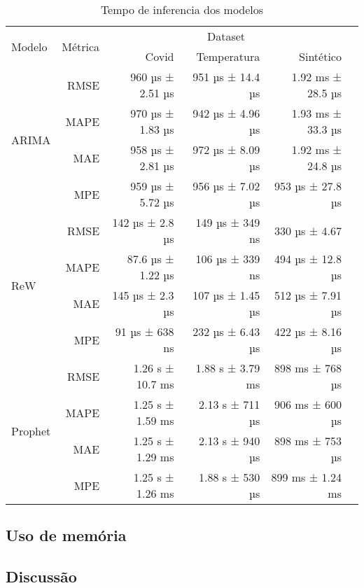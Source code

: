 \begin{table}[!htp]\centering
    \caption{Tempo de inferencia dos modelos}
    \begin{tabular}{lrrrrr}\toprule
    \multirow{2}{*}{Modelo} &\multirow{2}{*}{Métrica} &\multicolumn{3}{c}{Dataset} \\\cmidrule{3-5}
     &  & Covid & Temperatura & Sintético \\ \midrule
    \multirow{4}{*}{ARIMA} & RMSE & 960 µs ± 2.51 µs & 951 µs ± 14.4 µs & 1.92 ms ± 28.5 µs \\
     & MAPE & 970 µs ± 1.83 µs & 942 µs ± 4.96 µs & 1.93 ms ± 33.3 µs \\
     & MAE & 958 µs ± 2.81 µs & 972 µs ± 8.09 µs & 1.92 ms ± 24.8 µs \\
     & MPE & 959 µs ± 5.72 µs & 956 µs ± 7.02 µs & 953 µs ± 27.8 µs \\ \midrule
    \multirow{4}{*}{ReW} & RMSE & 142 µs ± 2.8 µs & 149 µs ± 349 ns & 330 µs ± 4.67 \\
     & MAPE & 87.6 µs ± 1.22 µs & 106 µs ± 339 ns & 494 µs ± 12.8 µs \\
     & MAE & 145 µs ± 2.3 µs & 107 µs ± 1.45 µs & 512 µs ± 7.91 µs \\
     & MPE & 91 µs ± 638 ns & 232 µs ± 6.43 µs & 422 µs ± 8.16 µs \\ \midrule
    \multirow{4}{*}{Prophet} & RMSE & 1.26 s ± 10.7 ms & 1.88 s ± 3.79 ms & 898 ms ± 768 µs \\
     & MAPE & 1.25 s ± 1.59 ms & 2.13 s ± 711 µs & 906 ms ± 600 µs \\
     & MAE & 1.25 s ± 1.29 ms & 2.13 s ± 940 µs & 898 ms ± 753 µs \\
     & MPE & 1.25 s ± 1.26 ms & 1.88 s ± 530 µs & 899 ms ± 1.24 ms \\ \midrule
    \end{tabular}
\end{table}

\subsection{Uso de memória}

\subsection{Discussão}
